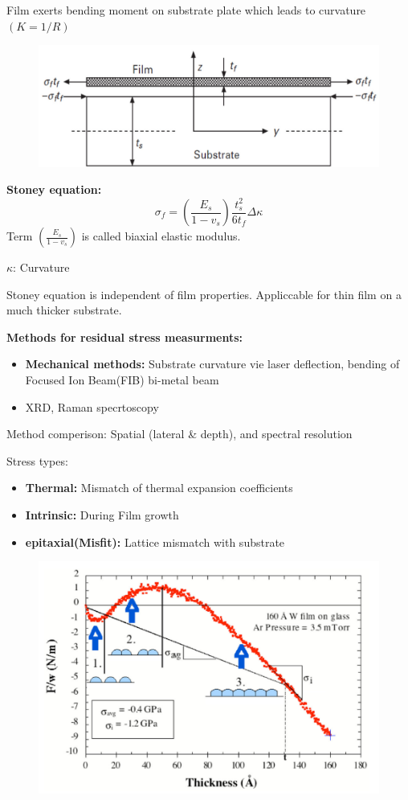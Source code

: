 Film exerts bending moment on substrate plate which leads to curvature \((K = 1/R)\)
\begin{figure}[!ht]
    \centering
    \includegraphics[width=\columnwidth]{images/stoney.png}
    \label{fig:stoney}
\end{figure}

\textbf{Stoney equation:}
\[
\sigma_f = \left(\frac{E_s}{1-v_s}\right)\frac{t^2_s}{6 t_f}\Delta \kappa
\]
Term \(\left(\frac{E_s}{1-v_s}\right)\) is called biaxial elastic modulus.

\(\kappa\): Curvature

Stoney equation is independent of film properties. Appliccable for thin film on a much thicker substrate.

\textbf{Methods for residual stress measurments:}
\begin{itemize}
    \item \textbf{Mechanical methods:} Substrate curvature vie laser deflection, bending of Focused Ion Beam(FIB) bi-metal beam
    \item XRD, Raman specrtoscopy 
\end{itemize}

Method comperison: Spatial (lateral \& depth), and spectral resolution

Stress types:
\begin{itemize}
    \item \textbf{Thermal:} Mismatch of thermal expansion coefficients
    \item \textbf{Intrinsic:} During Film growth
    \item \textbf{epitaxial(Misfit):} Lattice mismatch with substrate
\end{itemize}

\begin{figure}[h]
    \centering
    \includegraphics[width=\columnwidth]{images/insitu.png}
    \label{fig:insitu}
\end{figure}


